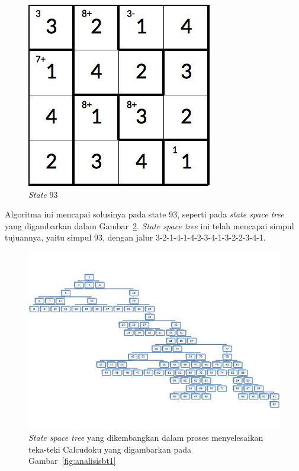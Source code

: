 \documentclass[a4paper,twoside]{article}
\begin{document}
\begin{enumerate}
\begin{itemize}
\begin{figure}
\centering
\captionsetup{justification=centering}
\includegraphics[scale=0.333]{Gambar/backtracking/State93}
\caption[\textit{State} 93]{\textit{State} 93}
\label{fig:analisisbt32}
\end{figure}

\end{itemize}

Algoritma ini mencapai solusinya pada state 93, seperti pada \textit{state space tree} yang digambarkan dalam Gambar~\ref{fig:analisisbt33}. \textit{State space tree} ini telah mencapai simpul tujuannya, yaitu simpul 93, dengan jalur 3-2-1-4-1-4-2-3-4-1-3-2-2-3-4-1.

\begin{landscape}
\begin{figure}
\centering
\captionsetup{justification=centering}
\includegraphics[scale=0.75]{Gambar/backtracking/StateSpaceTree}
\caption[\textit{State space tree} yang dikembangkan dalam proses menyelesaikan teka-teki Calcudoku yang digambarkan pada Gambar~\ref{fig:analisisbt1}]{\textit{State space tree} yang dikembangkan dalam proses menyelesaikan teka-teki Calcudoku yang digambarkan pada Gambar~\ref{fig:analisisbt1}}
\label{fig:analisisbt33}
\end{figure}
\end{landscape}


\end{enumerate}
\end{document}
